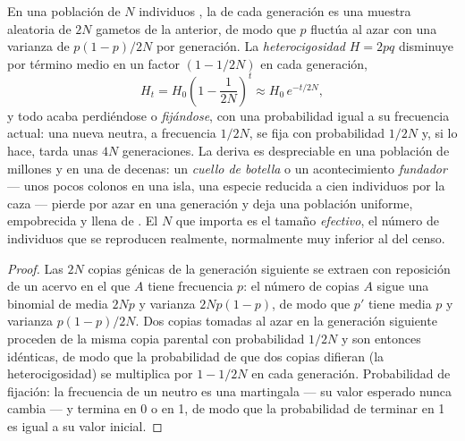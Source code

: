 \begin{theorem}\label{thm:b2:population-genetics:drift}
En una población de $N$ individuos , la  de
cada generación es una muestra aleatoria de $2N$ gametos de la anterior,
de modo que $p$ fluctúa al azar con una varianza de
$p(1 - p)/2N$ por generación. La \emph{heterocigosidad} $H = 2pq$
disminuye por término medio en un factor $(1 - 1/2N)$ en cada generación,
\[
H_t = H_0\left(1 - \frac{1}{2N}\right)^{t} \approx H_0\,e^{-t/2N},
\]
y todo  acaba perdiéndose o \emph{fijándose}, con una probabilidad
igual a su frecuencia actual: una nueva  neutra, a frecuencia
$1/2N$, se fija con probabilidad $1/2N$ y, si lo hace, tarda unas $4N$
generaciones. La deriva es despreciable en una población de millones y
 en una de decenas: un \emph{cuello de botella} o un
acontecimiento \emph{fundador} --- unos pocos colonos en una isla, una
especie reducida a cien individuos por la caza --- pierde  por azar
en una generación y deja una población uniforme, empobrecida y llena de
. El $N$ que importa es el tamaño \emph{efectivo}, el número de
individuos que se reproducen realmente, normalmente muy inferior al del
censo.
\end{theorem}
\begin{proof}
Las $2N$ copias génicas de la generación siguiente se extraen con
reposición de un acervo en el que $A$ tiene frecuencia $p$: el número de
copias $A$ sigue una binomial de media $2Np$ y varianza $2Np(1 - p)$, de
modo que $p'$ tiene media $p$ y varianza $p(1 - p)/2N$. Dos copias tomadas
al azar en la generación siguiente proceden de la misma copia parental con
probabilidad $1/2N$ y son entonces idénticas, de modo que la probabilidad
de que dos copias difieran (la heterocigosidad) se multiplica por
$1 - 1/2N$ en cada generación. Probabilidad de fijación: la frecuencia de
un  neutro es una martingala --- su valor esperado nunca cambia --- y
termina en 0 o en 1, de modo que la probabilidad de terminar en 1 es igual
a su valor inicial.
\end{proof}

